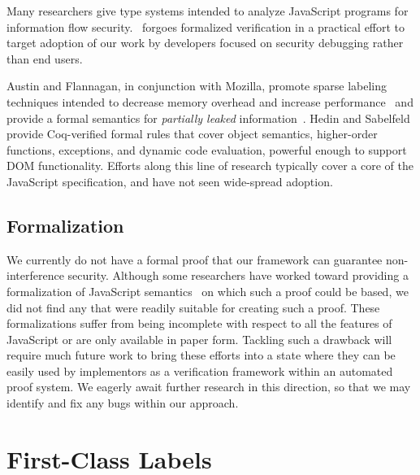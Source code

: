 Many researchers give type systems intended to analyze JavaScript programs for information flow security.
\JitFlow\ forgoes formalized verification in a practical effort to target adoption of our work by developers focused on security debugging rather than end users.

Austin and Flannagan, in conjunction with Mozilla, promote sparse labeling techniques intended to decrease memory overhead and increase performance~\cite{austin.flanagan+09} and provide a formal semantics for \emph{partially leaked} information~\cite{austin.flanagan+10}.
Hedin and Sabelfeld~\cite{hedin.sabelfeld+12} provide Coq-verified formal rules that cover object semantics, higher-order functions, exceptions, and dynamic code evaluation, powerful enough to support DOM functionality.
Efforts along this line of research typically cover a core of the JavaScript specification, and have not seen wide-spread adoption.

\subsection{Formalization}

We currently do not have a formal proof that our framework can guarantee non-interference security.
Although some researchers have worked toward providing a formalization of JavaScript semantics~\cite{yu2007javascript, herman2007status, maffeis2008operational, guha2010essence} on which such a proof could be based, we did not find any that were readily suitable for creating such a proof.
These formalizations suffer from being incomplete with respect to all the features of JavaScript or are only available in paper form.
Tackling such a drawback will require much future work to bring these efforts into a state where they can be easily used by implementors as a verification framework within an automated proof system.
We eagerly await further research in this direction, so that we may identify and fix any bugs within our approach.

\section{First-Class Labels}

